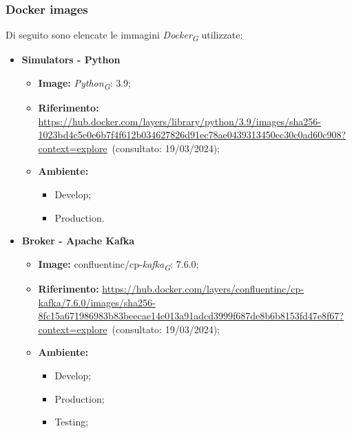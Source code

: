 \subsubsection{Docker images}

Di seguito sono elencate le immagini \textit{Docker}\textsubscript{\textit{G}} utilizzate:

\begin{itemize}

  \item \textbf{Simulators - Python} 
    \begin{itemize}
      \item \textbf{Image:} \textit{Python}\textsubscript{\textit{G}}: 3.9;
      \item \textbf{Riferimento:} \url{https://hub.docker.com/layers/library/python/3.9/images/sha256-1023bd4c5e0e6b7f4f612b034627826d91ec78ae0439313450ec30c0ad60c908?context=explore}~(consultato: 19/03/2024);
      \item \textbf{Ambiente:}
        \begin{itemize}
          \item Develop;
          \item Production.
        \end{itemize}
    \end{itemize}

  \item \textbf{Broker - Apache Kafka} 
    \begin{itemize}
      \item \textbf{Image:} confluentinc/cp-\textit{kafka}\textsubscript{\textit{G}}: 7.6.0;
      \item \textbf{Riferimento:} \url{https://hub.docker.com/layers/confluentinc/cp-kafka/7.6.0/images/sha256-8fc15a671986983b83beecae14e013a91adcd3999f687de8b6b8153fd47e8f67?context=explore}~(consultato: 19/03/2024);
      \item \textbf{Ambiente:}
        \begin{itemize}
          \item Develop;
          \item Production;
          \item Testing;
        \end{itemize}
    \end{itemize}


\end{itemize}
